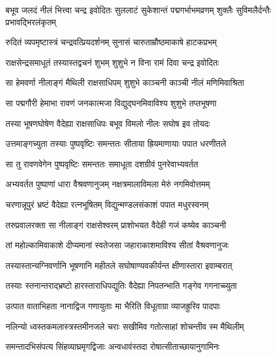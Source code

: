 \threelineshloka
{बभूव जलदं नीलं भित्त्वा चन्द्र इवोदितः}
{सुललाटं सुकेशान्तं पद्मगर्भाभमव्रणम्}
{शुक्लैः सुविमलैर्दन्तैः प्रभावद्भिरलंकृतम्} %

\twolineshloka
{रुदितं व्यपमृष्टास्त्रं चन्द्रवत्प्रियदर्शनम्}
{सुनासं चारुताम्रौष्ठमाकाषे हाटकप्रभम्} %

\twolineshloka
{राक्षसेन्द्रसमाधूतं तस्यास्तद्वचनं शुभम्}
{शुशुभे न विना रामं दिवा चन्द्र इवोदितः} %

\twolineshloka
{सा हेमवर्णा नीलाङ्गं मैथिली राक्षसाधिपम्}
{शुशुभे काञ्चनी काञ्ची नीलं मणिमिवाश्रिता} %

\twolineshloka
{सा पद्मगौरी हेमाभा रावणं जनकात्मजा}
{विद्युद्घनमिवाविश्य शुशुभे तप्तभूषणा} %

\twolineshloka
{तस्या भूषणघोषेण वैदेह्या राक्षसाधिपः}
{बभूव विमलो नीलः सघोष इव तोयदः} %

\twolineshloka
{उत्तमाङ्गच्युता तस्याः पुष्पवृष्टिः समन्ततः}
{सीताया ह्रियमाणायाः पपात धरणीतले} %

\twolineshloka
{सा तु रावणवेगेन पुष्पवृष्टिः समन्ततः}
{समाधूता दशग्रीवं पुनरेवाभ्यवर्तत} %

\twolineshloka
{अभ्यवर्तत पुष्पाणां धारा वैश्रवणानुजम्}
{नक्षत्रमालाविमला मेरुं नगमिवोत्तमम्} %

\twolineshloka
{चरणान्नूपुरं भ्रष्टं वैदेह्या रत्नभूषितम्}
{विद्युन्मण्डलसंकाशं पपात मधुरस्वनम्} %

\twolineshloka
{तरुप्रवालरक्ता सा नीलाङ्गं राक्षसेश्वरम्}
{प्राशोभयत वैदेही गजं कष्येव काञ्चनी} %

\twolineshloka
{तां महोल्कामिवाकाशे दीप्यमानां स्वतेजसा}
{जहाराकाशमाविश्य सीतां वैश्रवणानुजः} %

\twolineshloka
{तस्यास्तान्यग्निवर्णानि भूषणानि महीतले}
{सघोषाण्यवकीर्यन्त क्षीणास्तारा इवाम्बरात्} %

\twolineshloka
{तस्याः स्तनान्तराद्भ्रष्टो हारस्ताराधिपद्युतिः}
{वैदेह्या निपतन्भाति गङ्गेव गगनाच्च्युता} %

\twolineshloka
{उत्पात वाताभिहता नानाद्विज गणायुताः}
{मा भैरिति विधूताग्रा व्याजह्रुरिव पादपाः} %

\twolineshloka
{नलिन्यो ध्वस्तकमलास्त्रस्तमीनजले चराः}
{सखीमिव गतोत्साहां शोचन्तीव स्म मैथिलीम्} %

\twolineshloka
{समन्तादभिसंपत्य सिंहव्याघ्रमृगद्विजाः}
{अन्वधावंस्तदा रोषात्सीताच्छायानुगामिनः} %

